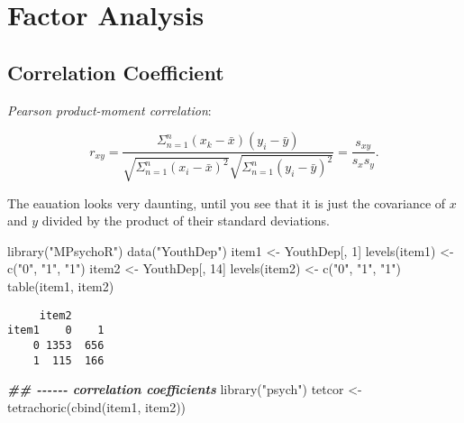 \documentclass[
]{book}
\newenvironment{Shaded}{\begin{snugshade}}{\end{snugshade}}
\newcommand{\DecValTok}[1]{\textcolor[rgb]{0.00,0.00,0.81}{#1}}
\newcommand{\DocumentationTok}[1]{\textcolor[rgb]{0.56,0.35,0.01}{\textbf{\textit{#1}}}}
\newcommand{\FunctionTok}[1]{\textcolor[rgb]{0.00,0.00,0.00}{#1}}
\newcommand{\NormalTok}[1]{#1}
\newcommand{\OtherTok}[1]{\textcolor[rgb]{0.56,0.35,0.01}{#1}}
\newcommand{\StringTok}[1]{\textcolor[rgb]{0.31,0.60,0.02}{#1}}
\begin{document}
\hypertarget{factor-analysis}{%
\chapter{Factor Analysis}\label{factor-analysis}}

\hypertarget{correlation-coefficient}{%
\section{Correlation Coefficient}\label{correlation-coefficient}}

\emph{Pearson product-moment correlation}:

\[
r_{xy} = \frac{\Sigma_{n=1}^n (x_k - \bar{x})(y_i - \bar{y})}{\sqrt{\Sigma_{n=1}^n(x_i - \bar{x})^2} \sqrt{\Sigma_{n=1}^n(y_i - \bar{y})^2}} = \frac{s_{xy}}{s_x s_y}.
\]

The eauation looks very daunting, until you see that it is just the covariance of \(x\) and \(y\) divided by the product of their standard deviations.

\begin{Shaded}
\begin{Highlighting}[]
\FunctionTok{library}\NormalTok{(}\StringTok{"MPsychoR"}\NormalTok{)}
\FunctionTok{data}\NormalTok{(}\StringTok{"YouthDep"}\NormalTok{)}
\NormalTok{item1 }\OtherTok{\textless{}{-}}\NormalTok{ YouthDep[, }\DecValTok{1}\NormalTok{]}
\FunctionTok{levels}\NormalTok{(item1) }\OtherTok{\textless{}{-}} \FunctionTok{c}\NormalTok{(}\StringTok{"0"}\NormalTok{, }\StringTok{"1"}\NormalTok{, }\StringTok{"1"}\NormalTok{)}
\NormalTok{item2 }\OtherTok{\textless{}{-}}\NormalTok{ YouthDep[, }\DecValTok{14}\NormalTok{]}
\FunctionTok{levels}\NormalTok{(item2) }\OtherTok{\textless{}{-}} \FunctionTok{c}\NormalTok{(}\StringTok{"0"}\NormalTok{, }\StringTok{"1"}\NormalTok{, }\StringTok{"1"}\NormalTok{)}
\FunctionTok{table}\NormalTok{(item1, item2)}
\end{Highlighting}
\end{Shaded}

\begin{verbatim}
     item2
item1    0    1
    0 1353  656
    1  115  166
\end{verbatim}

\begin{Shaded}
\begin{Highlighting}[]
\DocumentationTok{\#\# {-}{-}{-}{-}{-}{-} correlation coefficients}
\FunctionTok{library}\NormalTok{(}\StringTok{"psych"}\NormalTok{)}
\NormalTok{tetcor }\OtherTok{\textless{}{-}} \FunctionTok{tetrachoric}\NormalTok{(}\FunctionTok{cbind}\NormalTok{(item1, item2))}
\end{Highlighting}
\end{Shaded}
\end{document}

